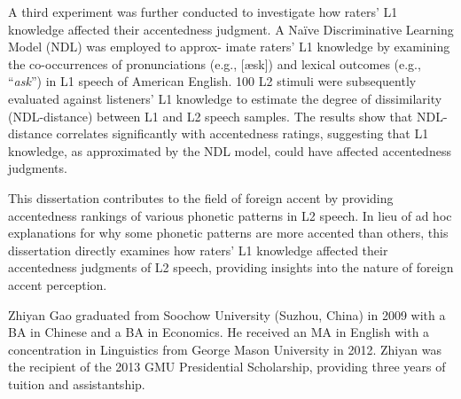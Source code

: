 \documentclass[11 pt]{report}
\begin{document}
A third experiment was further conducted to investigate how raters’ L1 knowledge affected their accentedness judgment. A Naïve Discriminative Learning Model (NDL) was employed to approx- imate raters’ L1 knowledge by examining the co-occurrences of pronunciations (e.g., [æsk]) and lexical outcomes (e.g., “\textit{ask}”) in L1 speech of American English. 100 L2 stimuli were subsequently evaluated against listeners’ L1 knowledge to estimate the degree of dissimilarity (NDL-distance) between L1 and L2 speech samples. The results show that NDL-distance correlates significantly with accentedness ratings, suggesting that L1 knowledge, as approximated by the NDL model, could have affected accentedness judgments.

This dissertation contributes to the field of foreign accent by providing accentedness rankings of various phonetic patterns in L2 speech. In lieu of ad hoc explanations for why some phonetic patterns are more accented than others, this dissertation directly examines how raters’ L1 knowledge affected their accentedness judgments of L2 speech, providing insights into the nature of foreign accent perception.



\startofchapters












\appendix
\appendixeqnumbering






%
%

%
%
%

\printbibliography


\cvpage

Zhiyan Gao graduated from Soochow University (Suzhou, China) in 2009 with a BA in Chinese and a BA in Economics. He received an MA in English with a concentration in Linguistics from George Mason University in 2012. Zhiyan was the recipient of the 2013 GMU Presidential Scholarship, providing three years of tuition and assistantship.
\end{document}
